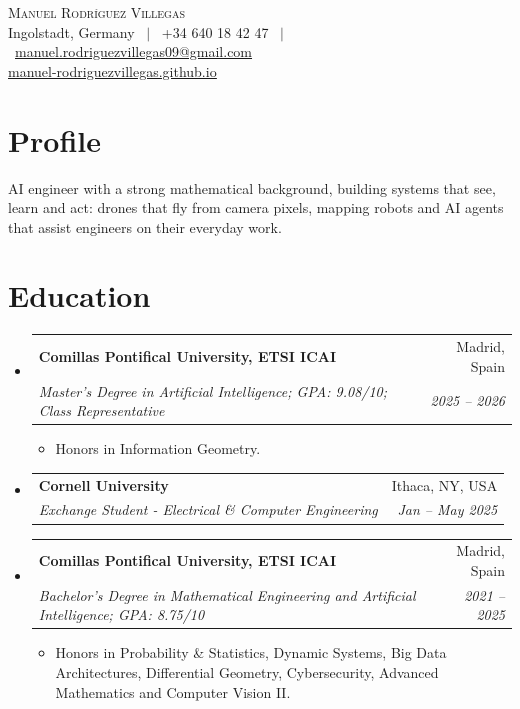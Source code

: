 \documentclass[a4paper,11pt]{article}
\makeatletter
\newcommand{\resumeItem}[1]{\item\small{{#1 \vspace{-2pt}}}}
\newcommand{\resumeSubheading}[4]{
  \vspace{-2pt}\item
    \begin{tabular*}{0.97\textwidth}[t]{l@{\extracolsep{\fill}}r}
      \textbf{#1} & #2 \\
      \textit{\small#3} & \textit{\small #4} \\
    \end{tabular*}\vspace{-7pt}
}
\newcommand{\resumeSubHeadingListStart}{\begin{itemize}[leftmargin=0.15in, label={}]}
\newcommand{\resumeSubHeadingListEnd}{\end{itemize}}
\newcommand{\resumeItemListStart}{\begin{itemize}}
\newcommand{\resumeItemListEnd}{\end{itemize}\vspace{-5pt}}
\makeatother
\begin{document}
\begin{center}
    {\Huge \scshape Manuel Rodríguez Villegas} \\ \vspace{1mm}
    Ingolstadt, Germany \ $|$ \ +34 640 18 42 47 \ $|$ \
    \href{mailto:manuel.rodriguezvillegas09@gmail.com}{\underline{manuel.rodriguezvillegas09@gmail.com}} \\ \vspace{1mm}
    \href{https://manuel-rodriguezvillegas.github.io}{\underline{manuel-rodriguezvillegas.github.io}}
\end{center}

\small

\section{Profile}
AI engineer with a strong mathematical background, building systems that see, learn and act: drones that fly from camera pixels, mapping robots and AI agents that assist engineers on their everyday work.

\section{Education}
\resumeSubHeadingListStart
\resumeSubheading
    {Comillas Pontifical University, ETSI ICAI}{Madrid, Spain}
    {Master's Degree in Artificial Intelligence; GPA: 9.08/10; Class Representative}{2025 -- 2026}
  \resumeItemListStart
    \resumeItem{Honors in Information Geometry.}
  \resumeItemListEnd

  \resumeSubheading
    {Cornell University}{Ithaca, NY, USA}
    {Exchange Student - Electrical \& Computer Engineering}{Jan -- May 2025}
    \vspace{2pt}
  
  \resumeSubheading
    {Comillas Pontifical University, ETSI ICAI}{Madrid, Spain}
    {Bachelor's Degree in Mathematical Engineering and Artificial Intelligence; GPA: 8.75/10}{2021 -- 2025}
  \resumeItemListStart
    \resumeItem{Honors in Probability \& Statistics, Dynamic Systems, Big Data Architectures, Differential Geometry, Cybersecurity, Advanced Mathematics and Computer Vision II.}
  \resumeItemListEnd
  
\resumeSubHeadingListEnd

\end{document}
